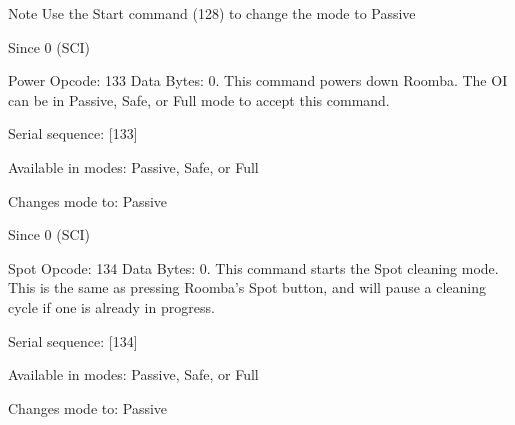 \begin{Desc}
\begin{description}
\begin{DoxyNote}{Note}
Use the Start command (128) to change the mode to Passive
\end{DoxyNote}
\begin{DoxySince}{Since}
0 (S\+C\+I) 
\end{DoxySince}
\item[{\em 
\hypertarget{group__roomba-lib_gga305e17dfb7050ad83ea49ded2e6a2e24a5f448683aabbaddfd5a6f82e2e03a571}{}R\+O\+O\+M\+B\+A\+\_\+\+P\+O\+W\+E\+R\label{group__roomba-lib_gga305e17dfb7050ad83ea49ded2e6a2e24a5f448683aabbaddfd5a6f82e2e03a571}
}]Power Opcode\+: 133 Data Bytes\+: 0. This command powers down Roomba. The O\+I can be in Passive, Safe, or Full mode to accept this command.
\begin{DoxyItemize}
\item Serial sequence\+: \mbox{[}133\mbox{]}
\item Available in modes\+: Passive, Safe, or Full
\item Changes mode to\+: Passive
\end{DoxyItemize}

\begin{DoxySince}{Since}
0 (S\+C\+I) 
\end{DoxySince}
\item[{\em 
\hypertarget{group__roomba-lib_gga305e17dfb7050ad83ea49ded2e6a2e24a51432a5c7706ae489570eca7ba0a55b8}{}R\+O\+O\+M\+B\+A\+\_\+\+S\+P\+O\+T\label{group__roomba-lib_gga305e17dfb7050ad83ea49ded2e6a2e24a51432a5c7706ae489570eca7ba0a55b8}
}]Spot Opcode\+: 134 Data Bytes\+: 0. This command starts the Spot cleaning mode. This is the same as pressing Roomba’s Spot button, and will pause a cleaning cycle if one is already in progress.
\begin{DoxyItemize}
\item Serial sequence\+: \mbox{[}134\mbox{]}
\item Available in modes\+: Passive, Safe, or Full
\item Changes mode to\+: Passive
\end{DoxyItemize}


\end{description}
\end{Desc}
